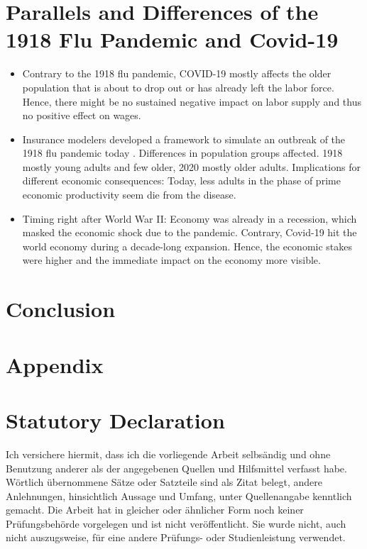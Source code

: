 \documentclass[12pt,a4paper]{article}
\begin{document}
\section{Parallels and Differences of the 1918 Flu Pandemic and Covid-19}
\begin{itemize}
	\item Contrary to the 1918 flu pandemic, COVID-19 mostly affects the older population that is about to drop out or has already left the labor force.
	Hence, there might be no sustained negative impact on labor supply and thus no positive effect on wages.
	\item Insurance modelers developed a framework to simulate an outbreak of the 1918 flu pandemic today \citep{madhavModelingModernDay2013}. Differences in population groups affected. 1918 mostly young adults and few older, 2020 mostly older adults.	Implications for different economic consequences: Today, less adults in the phase of prime economic productivity seem die from the disease.
	\item Timing right after World War II: Economy was already in a recession, which masked the economic shock due to the pandemic.
	Contrary, Covid-19 hit the world economy during a decade-long expansion.
	Hence, the economic stakes were higher and the immediate impact on the economy more visible.
\end{itemize}






\section{Conclusion}

\clearpage
\appendix
\section{Appendix}

\clearpage


\newpage
\thispagestyle{empty}
\section*{Statutory Declaration}

Ich versichere hiermit, dass ich die vorliegende Arbeit selbs\"andig und ohne Benutzung anderer als der angegebenen Quellen und Hilfsmittel verfasst habe. W\"ortlich \"ubernommene S\"atze oder Satzteile sind als Zitat belegt, andere Anlehnungen, hinsichtlich Aussage und Umfang, unter Quellenangabe kenntlich gemacht. Die Arbeit hat in gleicher oder \"ahnlicher Form noch keiner Pr\"ufungsbeh\"orde vorgelegen und ist nicht ver\"offentlicht. Sie wurde nicht, auch nicht auszugsweise, f\"ur eine andere Pr\"ufungs- oder Studienleistung verwendet.
\end{document}
